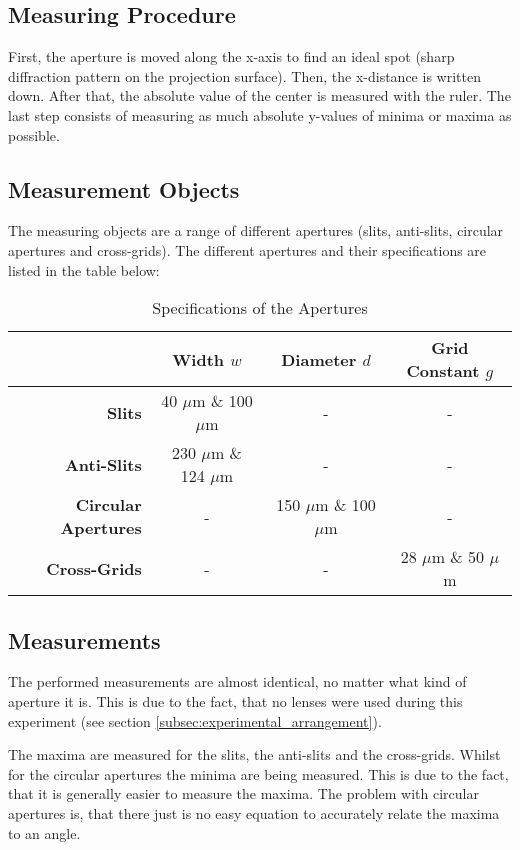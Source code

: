 \subsection{Measuring Procedure}
\label{subsec:measuring_procedure}
First, the aperture is moved along the x-axis to find an ideal spot (sharp diffraction pattern on the projection surface). Then, the x-distance is written down. After that, the absolute value of the center is measured with the ruler. The last step consists of measuring as much absolute y-values of minima or maxima as possible.

\subsection{Measurement Objects}
\label{subsec:measurement_objects}
The measuring objects are a range of different apertures (slits, anti-slits, circular apertures and cross-grids). The different apertures and their specifications are listed in the table below:

\begin{table}[H]
	\centering
	\renewcommand{\arraystretch}{1.2}
	\begin{tabular}{r|c|c|c}
		 & \textbf{Width $w$} & \textbf{Diameter $d$} & \textbf{Grid Constant $g$} \\
		\hline
		\textbf{Slits} & 40 $\mu$m \& 100 $\mu$m & - & - \\
		\textbf{Anti-Slits} & 230 $\mu$m \& 124 $\mu$m & - & - \\
		\textbf{Circular Apertures} & - & 150 $\mu$m \& 100 $\mu$m & - \\
		\textbf{Cross-Grids} & - & - & 28 $\mu$m \& 50 $\mu$m \\ \hline
	\end{tabular}
	\caption{Specifications of the Apertures}
	\label{tab:Specifications_Apertures}
\end{table}

\subsection{Measurements}
\label{subsec:Measurements}
The performed measurements are almost identical, no matter what kind of aperture it is. This is due to the fact, that no lenses were used during this experiment (see section \ref{subsec:experimental_arrangement}).

The maxima are measured for the slits, the anti-slits and the cross-grids. Whilst for the circular apertures the minima are being measured. This is due to the fact, that it is generally easier to measure the maxima. The problem with circular apertures is, that there just is no easy equation to accurately relate the maxima to an angle.
